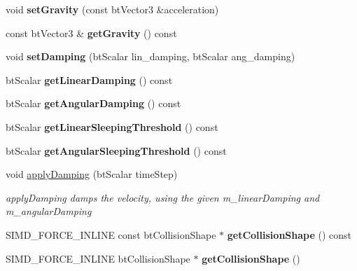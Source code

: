 \begin{DoxyCompactItemize}
void {\bfseries set\+Gravity} (const bt\+Vector3 \&acceleration)
\item 
\mbox{\label{classbtRigidBody_a081e31d62e12cca594466d1ae26082ac}} 
const bt\+Vector3 \& {\bfseries get\+Gravity} () const
\item 
\mbox{\label{classbtRigidBody_ace302f6d75db7e4cd64305dd4d20114b}} 
void {\bfseries set\+Damping} (bt\+Scalar lin\+\_\+damping, bt\+Scalar ang\+\_\+damping)
\item 
\mbox{\label{classbtRigidBody_abb2055b024d5f9262201a96482072c13}} 
bt\+Scalar {\bfseries get\+Linear\+Damping} () const
\item 
\mbox{\label{classbtRigidBody_a4dc018caac250454251d3fb58f020892}} 
bt\+Scalar {\bfseries get\+Angular\+Damping} () const
\item 
\mbox{\label{classbtRigidBody_a396bae2e385e6c4a8f31b2bedb513ac6}} 
bt\+Scalar {\bfseries get\+Linear\+Sleeping\+Threshold} () const
\item 
\mbox{\label{classbtRigidBody_a9c9e0b4a0c367af11e6ca82f4de4b539}} 
bt\+Scalar {\bfseries get\+Angular\+Sleeping\+Threshold} () const
\item 
\mbox{\label{classbtRigidBody_a3fecb8c50d734095f33e2c7624bfba2c}} 
void \hyperlink{classbtRigidBody_a3fecb8c50d734095f33e2c7624bfba2c}{apply\+Damping} (bt\+Scalar time\+Step)
\begin{DoxyCompactList}\small\item\em apply\+Damping damps the velocity, using the given m\+\_\+linear\+Damping and m\+\_\+angular\+Damping \end{DoxyCompactList}\item 
\mbox{\label{classbtRigidBody_a09847b287e58981e6b7cfc825f514ab2}} 
S\+I\+M\+D\+\_\+\+F\+O\+R\+C\+E\+\_\+\+I\+N\+L\+I\+NE const bt\+Collision\+Shape $\ast$ {\bfseries get\+Collision\+Shape} () const
\item 
\mbox{\label{classbtRigidBody_a4c79924fbf05ebb79859758b650841b8}} 
S\+I\+M\+D\+\_\+\+F\+O\+R\+C\+E\+\_\+\+I\+N\+L\+I\+NE bt\+Collision\+Shape $\ast$ {\bfseries get\+Collision\+Shape} ()

\end{DoxyCompactItemize}
